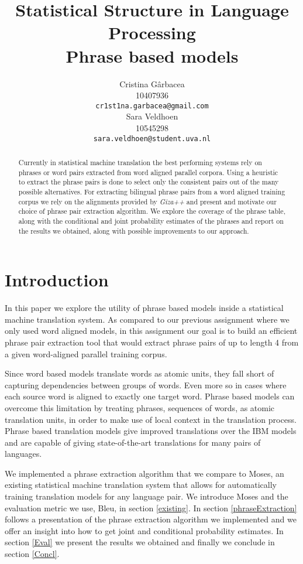\documentclass[11pt]{article}
\title{Statistical Structure in Language Processing \\ Phrase based models}
\author{ Cristina G\^arbacea\\
  10407936 \\
  {\small \tt cr1st1na.garbacea@gmail.com} 
  \\\And
  Sara Veldhoen \\
10545298   \\
  {\small \tt sara.veldhoen@student.uva.nl} \\}
\date{}
\begin{document}
\maketitle

\begin{abstract}
Currently in statistical machine translation the best performing systems rely on phrases or word pairs extracted from word aligned parallel corpora. Using a heuristic to extract the phrase pairs is done to select only the consistent pairs out of the many possible alternatives. For extracting bilingual phrase pairs from a word aligned training corpus we rely on the alignments provided by \textit{Giza++} and present and motivate our choice of phrase pair extraction algorithm. We explore the coverage of the phrase table, along with the conditional and joint probability estimates of the phrases and report on the results we obtained, along with possible improvements to our approach.
\end{abstract}

\section{Introduction}
In this paper we explore the utility of phrase based models inside a statistical machine translation system. As compared to our previous assignment where we only used word aligned models, in this assignment our goal is to build an efficient phrase pair extraction tool that would extract phrase pairs of up to length 4 from a given word-aligned parallel training corpus. 

Since word based models translate words as atomic units, they fall short of capturing dependencies between groups of words. 
Even more so in cases where each source word is aligned to exactly one target word.
 Phrase based models can overcome this limitation by treating phrases, sequences of words, as atomic translation units, in order to make use of local context in the translation process. Phrase based translation models give improved translations over the IBM models and are capable of giving state-of-the-art translations for many pairs of languages.


We implemented a phrase extraction algorithm that we compare to Moses, an existing statistical machine translation system that allows for automatically training translation models for any language pair. We introduce Moses and the evaluation metric we use, Bleu, in section \ref{existing}. In section \ref{phraseExtraction} follows a presentation of the phrase extraction algorithm we implemented and we offer an insight into how to get joint and conditional probability estimates.
In section \ref{Eval} we present the results we obtained and finally we conclude in section \ref{Concl}.
\end{document}
